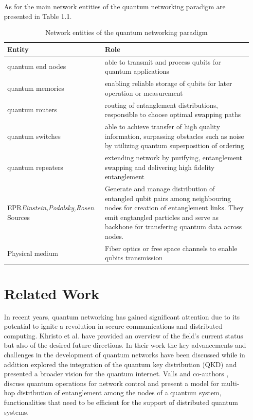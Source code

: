 		As for the main network entities of the quantum networking paradigm\cite{e-qnet} are presented in Table 1.1.

		\begin{table}[h!]
		\centering
		\renewcommand{\arraystretch}{1.5}
			\begin{tabular}{|p{5.5cm}|p{10cm}|}
			\hline
			\textbf{Entity} & \textbf{Role} \\ \hline
			quantum end nodes	&  able to transmit and process qubits for quantum applications		\\ \hline
			quantum memories	&  enabling reliable storage of qubits for later operation or measurement 		\\ \hline
			quantum routers		&  routing of entanglement distributions, responsible to choose optimal swapping paths 		\\ \hline
			quantum switches	&  able to achieve transfer of high quality information, surpassing obstacles such as noise by utilizing quantum
				superposition of ordering \\ \hline
			quantum repeaters	& extending network by purifying, entanglement swapping and delivering high fidelity entanglement 		\\ \hline
				EPR\textit{Einstein,Podolsky,Rosen} Sources		&  Generate and manage distribution of entangled qubit pairs among neighbouring nodes for creation of entanglement links. They emit engtangled particles and serve as backbone for transfering quantum data across nodes.		\\ \hline
			Physical medium		&  Fiber optics or free space channels to enable qubits transmission		\\ \hline
		\end{tabular}
		\caption{Network entities of the quantum networking paradigm}
		\label{tab:example}
		\end{table}


\chapter{Related Work}
		In recent years, quantum networking has gained
		significant attention due to its potential to ignite a revolution in
		secure communications and distributed computing.
		Khristo et al. \cite{Khristo2020} have provided an overview of the field's
		current status but also of the desired future directions.
		In their work the key advancements and challenges in the
		development of quantum networks have been discussed while in addition
		explored the integration of the quantum key distribution (QKD)
		and presented a broader vision for the quantum internet.
		Valls and co-authors \cite{brief-intro}, discuss quantum operations for network
		control and present a model for multi-hop distribution of entanglement among the nodes of
		a quantum system, functionalities that need to be efficient for the support of distributed
		quantum systems. 
	
